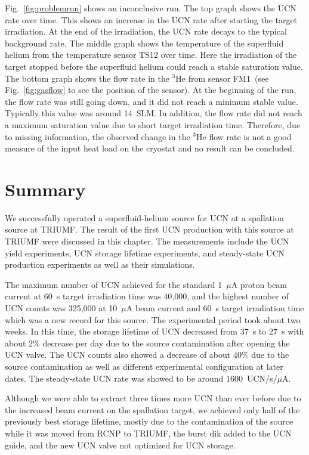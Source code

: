 Fig.~\ref{fig:problemrun} shows an inconclusive run. The top graph
shows the UCN rate over time. This shows an increase in the UCN rate
after starting the target irradiation. At the end of the irradiation,
the UCN rate decays to the typical background rate. The middle graph
shows the temperature of the superfluid helium from the temperature
sensor TS12 over time. Here the irradiation of the target stopped
before the superfluid helium could reach a stable saturation
value. The bottom graph shows the flow rate in the $^3$He from sensor
FM1~(see Fig.~\ref{fig:gasflow} to see the position of the sensor). At
the beginning of the run, the flow rate was still going down, and it
did not reach a minimum stable value. Typically this value was around
14~SLM. In addition, the flow rate did not reach a maximum saturation
value due to short target irradiation time. Therefore, due to missing
information, the observed change in the $^3$He flow rate is not a good
measure of the input heat load on the cryostat and no result can be
concluded.


\section{Summary}
We successfully operated a superfluid-helium source for UCN at a
spallation source at TRIUMF. The result of the first UCN production
with this source at TRIUMF were discussed in this
chapter. The measurements include the UCN yield experiments, UCN
storage lifetime experiments, and steady-state UCN production
experiments as well as their simulations.

The maximum number of UCN achieved for the standard 1~$\mu$A proton
beam current at 60~s target irradiation time was 40,000, and the
highest number of UCN counts was 325,000 at 10~$\mu$A beam current and
60~s target irradiation time which was a new record for this
source. The experimental period took about two weeks. In this time,
the storage lifetime of UCN decreased from 37~s to 27~s with about 2\%
decrease per day due to the source contamination after opening the UCN
valve. The UCN counts also showed a decrease of about 40\% due to the
source contamination as well as different experimental configuration
at later dates. The steady-state UCN rate was showed to be around
1600~UCN/s/$\mu$A.

Although we were able to extract three times more UCN than ever before
due to the increased beam current on the spallation target, we
achieved only half of the previously best storage lifetime, mostly due
to the contamination of the source while it was moved from RCNP to
TRIUMF, the burst dik added to the UCN guide, and the new UCN valve
not optimized for UCN storage.

